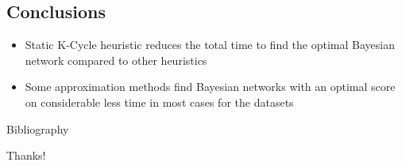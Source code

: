 \subsection{Conclusions}

\begin{frame}
	\begin{itemize}
		\item Static K-Cycle heuristic reduces the total time to find the optimal Bayesian network compared to other heuristics
		\item Some approximation methods find Bayesian networks with an optimal score on considerable less time in most cases for the datasets
	\end{itemize}
\end{frame}

\begin{frame}{Bibliography}
\end{frame}

\begin{frame}
	\centering
	\LARGE{Thanks!}
\end{frame}